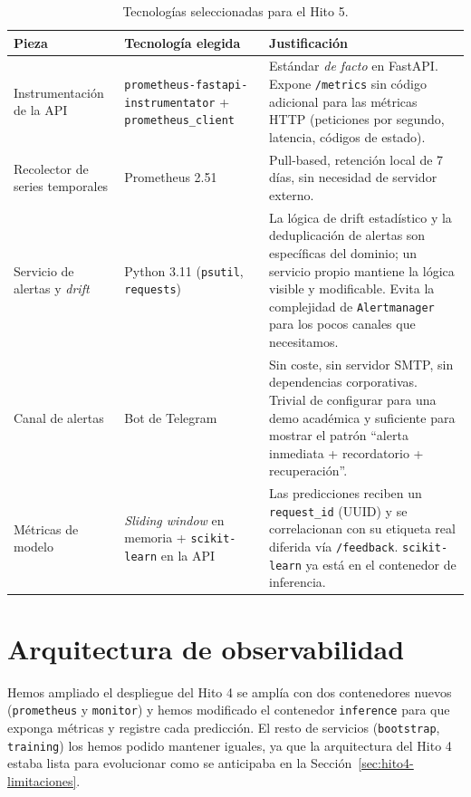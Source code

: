 \documentclass[12pt,a4paper]{report}
\begin{document}
\begin{table}[H]
\centering
\small
\begin{tabular}{l p{4.5cm} p{6cm}}
\toprule
\textbf{Pieza} & \textbf{Tecnología elegida} & \textbf{Justificación} \\
\midrule
Instrumentación de la API & \texttt{prometheus-fastapi-instrumentator} + \texttt{prometheus\_client} & Estándar \textit{de facto} en FastAPI. Expone \texttt{/metrics} sin código adicional para las métricas HTTP (peticiones por segundo, latencia, códigos de estado). \\
Recolector de series temporales & Prometheus 2.51 & Pull-based, retención local de 7 días, sin necesidad de servidor externo. \\
Servicio de alertas y \textit{drift} & Python 3.11 (\texttt{psutil}, \texttt{requests}) & La lógica de drift estadístico y la deduplicación de alertas son específicas del dominio; un servicio propio mantiene la lógica visible y modificable. Evita la complejidad de \texttt{Alertmanager} para los pocos canales que necesitamos. \\
Canal de alertas & Bot de Telegram & Sin coste, sin servidor SMTP, sin dependencias corporativas. Trivial de configurar para una demo académica y suficiente para mostrar el patrón ``alerta inmediata + recordatorio + recuperación''. \\
Métricas de modelo & \textit{Sliding window} en memoria + \texttt{scikit-learn} en la API & Las predicciones reciben un \texttt{request\_id} (UUID) y se correlacionan con su etiqueta real diferida vía \texttt{/feedback}. \texttt{scikit-learn} ya está en el contenedor de inferencia. \\
\bottomrule
\end{tabular}
\caption{Tecnologías seleccionadas para el Hito 5.}
\label{tab:hito5-tecnologias}
\end{table}

\section{Arquitectura de observabilidad}
\label{sec:hito5-arquitectura}

Hemos ampliado el despliegue del Hito 4 se amplía con dos contenedores nuevos (\texttt{prometheus} y \texttt{monitor}) y hemos modificado el contenedor \texttt{inference} para que exponga métricas y registre cada predicción. El resto de servicios (\texttt{bootstrap}, \texttt{training}) los hemos podido mantener iguales, ya que la arquitectura del Hito 4 estaba lista para evolucionar como se anticipaba en la Sección~\ref{sec:hito4-limitaciones}.
\end{document}
